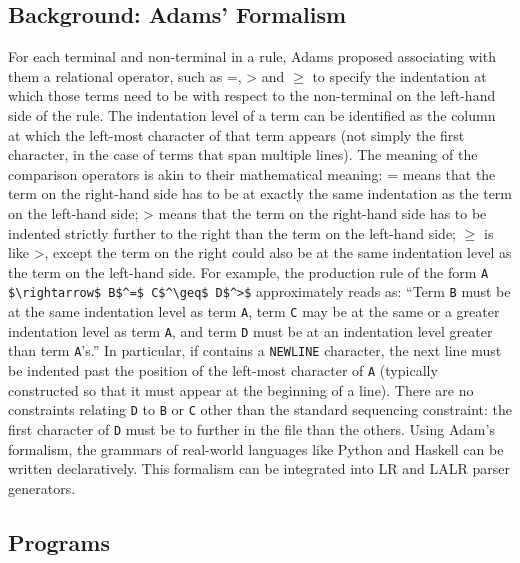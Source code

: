 \subsection{Background: Adams' Formalism}
For each terminal and non-terminal in a rule, Adams proposed associating with them a relational operator, such as =, > and $\geq$ to specify the indentation at which those terms need to be with respect to the non-terminal on the left-hand side of the rule. The indentation level of a term can be identified as the column at which the left-most character of that term appears (not simply the first character, in the case of terms that span multiple lines). The meaning of the comparison operators is akin to their mathematical meaning: = means that the term on the right-hand side has to be at exactly the same indentation as the term on the left-hand side; >  means that the term on the right-hand side has to be indented strictly further to the right than the term on the left-hand side; $\geq$ is like >, except the term on the right could also be at the same indentation level as the term on the left-hand side. For example, the production rule of the form \lstinline{A $\rightarrow$ B$^=$ C$^\geq$ D$^>$} approximately reads as: ``Term \lstinline{B} must be at the same indentation level as term \lstinline{A}, term \lstinline{C} may be at the same or a greater indentation level as term \lstinline{A}, and term \lstinline{D} must be at an indentation level greater than term \lstinline{A}'s.'' In particular, if  contains a \lstinline{NEWLINE} character, the next line must be indented past the position of the left-most character of \lstinline{A} (typically constructed so that it must appear at the beginning of a line). There are no constraints relating \lstinline{D} to \lstinline{B} or \lstinline{C} other than the standard sequencing constraint: the first character of \lstinline{D} must be to further in the file than the others. Using Adam's formalism, the grammars of real-world languages like Python and Haskell can be written declaratively. This formalism can be integrated into LR and LALR parser generators.



\subsection{Programs}


